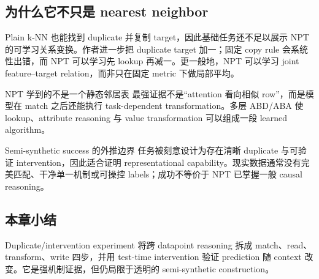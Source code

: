 \subsection{为什么它不只是 nearest neighbor}

Plain k-NN 也能找到 duplicate 并复制 target，因此基础任务还不足以展示 NPT 的可学习关系变换。作者进一步把 duplicate target 加一；固定 copy rule 会系统性出错，而 NPT 可以学习先 lookup 再减一。更一般地，NPT 可以学习 joint feature--target relation，而非只在固定 metric 下做局部平均。

\begin{importantbox}{NPT 学到的不是一个静态邻居表}
最强证据不是“attention 看向相似 row”，而是模型在 match 之后还能执行 task-dependent transformation。多层 ABD/ABA 使 lookup、attribute reasoning 与 value transformation 可以组成一段 learned algorithm。
\end{importantbox}


\begin{warningbox}{Semi-synthetic success 的外推边界}
任务被刻意设计为存在清晰 duplicate 与可验证 intervention，因此适合证明 representational capability。现实数据通常没有完美匹配、干净单一机制或可操控 labels；成功不等价于 NPT 已掌握一般 causal reasoning。
\end{warningbox}

\subsection{本章小结}

Duplicate/intervention experiment 将跨 datapoint reasoning 拆成 match、read、transform、write 四步，并用 test-time intervention 验证 prediction 随 context 改变。它是强机制证据，但仍局限于透明的 semi-synthetic construction。

